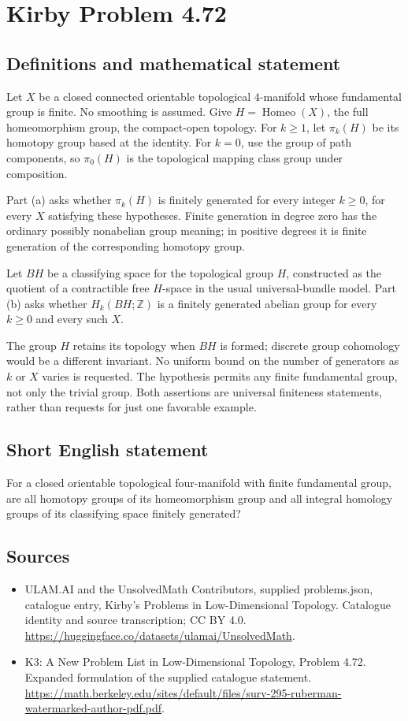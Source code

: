 \documentclass[11pt,a4paper]{article}
\begin{document}
\section*{Kirby Problem 4.72}\label{statement}

\subsection{Definitions and mathematical statement}
Let $X$ be a closed connected orientable topological $4$-manifold
whose fundamental group is finite. No smoothing is assumed.
Give $H=\operatorname{Homeo}(X)$, the full homeomorphism group,
the compact-open topology. For $k\ge1$, let $\pi_k(H)$ be its
homotopy group based at the identity. For $k=0$, use the group
of path components, so $\pi_0(H)$ is the topological mapping
class group under composition.

Part (a) asks whether $\pi_k(H)$ is finitely generated for every
integer $k\ge0$, for every $X$ satisfying these hypotheses.
Finite generation in degree zero has the ordinary possibly
nonabelian group meaning; in positive degrees it is finite generation
of the corresponding homotopy group.

Let $BH$ be a classifying space for the topological group $H$,
constructed as the quotient of a contractible free $H$-space in
the usual universal-bundle model. Part (b) asks whether
$H_k(BH;\mathbb Z)$ is a finitely generated abelian group for
every $k\ge0$ and every such $X$.

The group $H$ retains its topology when $BH$ is formed; discrete
group cohomology would be a different invariant. No uniform bound
on the number of generators as $k$ or $X$ varies is requested.
The hypothesis permits any finite fundamental group, not only
the trivial group. Both assertions are universal finiteness
statements, rather than requests for just one favorable example.
\subsection{Short English statement}
For a closed orientable topological four-manifold with finite fundamental group, are all homotopy groups of its homeomorphism group and all integral homology groups of its classifying space finitely generated?
\subsection{Sources}
\begin{itemize}
\item[S1] ULAM.AI and the UnsolvedMath Contributors, supplied problems.json, catalogue entry, Kirby's Problems in Low-Dimensional Topology. Catalogue identity and source transcription; CC BY 4.0.
\url{https://huggingface.co/datasets/ulamai/UnsolvedMath}.
\item[S2] K3: A New Problem List in Low-Dimensional Topology, Problem 4.72. Expanded formulation of the supplied catalogue statement.
\url{https://math.berkeley.edu/sites/default/files/surv-295-ruberman-watermarked-author-pdf.pdf}.
\end{itemize}
\end{document}

